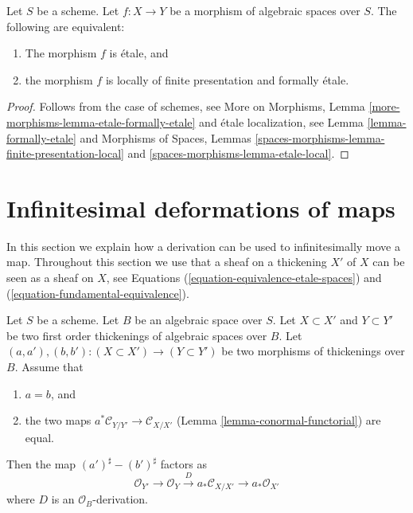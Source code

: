 \begin{lemma}
\label{lemma-etale-formally-etale}
Let $S$ be a scheme.
Let $f : X \to Y$ be a morphism of algebraic spaces over $S$.
The following are equivalent:
\begin{enumerate}
\item The morphism $f$ is \'etale, and
\item the morphism $f$ is locally of finite presentation and
formally \'etale.
\end{enumerate}
\end{lemma}

\begin{proof}

Follows from the case of schemes, see
More on Morphisms,
Lemma \ref{more-morphisms-lemma-etale-formally-etale}
and \'etale localization, see
Lemma \ref{lemma-formally-etale}
and
Morphisms of Spaces,
Lemmas \ref{spaces-morphisms-lemma-finite-presentation-local} and
\ref{spaces-morphisms-lemma-etale-local}.
\end{proof}















\section{Infinitesimal deformations of maps}
\label{section-action-by-derivations}

\noindent
In this section we explain how a derivation can be used to
infinitesimally move a map. Throughout this section we use that
a sheaf on a thickening $X'$ of $X$ can be seen as a sheaf on $X$, see
Equations (\ref{equation-equivalence-etale-spaces}) and
(\ref{equation-fundamental-equivalence}).

\begin{lemma}
\label{lemma-difference-derivation}
Let $S$ be a scheme. Let $B$ be an algebraic space over $S$.
Let $X \subset X'$ and $Y \subset Y'$ be two first order thickenings
of algebraic spaces over $B$.
Let $(a, a'), (b, b') : (X \subset X') \to (Y \subset Y')$
be two morphisms of thickenings over $B$. Assume that
\begin{enumerate}
\item $a = b$, and
\item the two maps $a^*\mathcal{C}_{Y/Y'} \to \mathcal{C}_{X/X'}$
(Lemma \ref{lemma-conormal-functorial})
are equal.
\end{enumerate}
Then the map $(a')^\sharp - (b')^\sharp$ factors as
$$
\mathcal{O}_{Y'} \to \mathcal{O}_Y \xrightarrow{D}
a_*\mathcal{C}_{X/X'} \to a_*\mathcal{O}_{X'}
$$
where $D$ is an $\mathcal{O}_B$-derivation.
\end{lemma}

